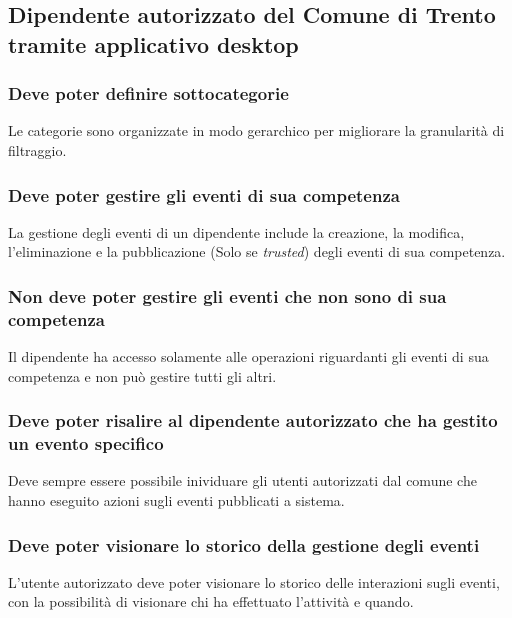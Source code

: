 \documentclass{article}
\begin{document}
\subsection{Dipendente autorizzato del Comune di Trento tramite applicativo desktop}

\subsubsection{Deve poter definire sottocategorie}
Le categorie sono organizzate in modo gerarchico per migliorare la granularità di filtraggio.

\subsubsection{Deve poter gestire gli eventi di sua competenza}
La gestione degli eventi di un dipendente include la creazione, la modifica, l'eliminazione e la pubblicazione (Solo se \textit{trusted}) degli eventi di sua competenza.


\subsubsection{Non deve poter gestire gli eventi che non sono di sua competenza}
Il dipendente ha accesso solamente alle operazioni riguardanti gli eventi di sua competenza e non può gestire tutti gli altri.

\subsubsection{Deve poter risalire al dipendente autorizzato che ha gestito un evento specifico}
Deve sempre essere possibile inividuare gli utenti autorizzati dal comune che hanno eseguito azioni sugli eventi pubblicati a sistema.

\subsubsection{Deve poter visionare lo storico della gestione degli eventi}
L'utente autorizzato deve poter visionare lo storico delle interazioni sugli eventi, con la possibilità di visionare chi ha effettuato l'attività e quando.
\end{document}
